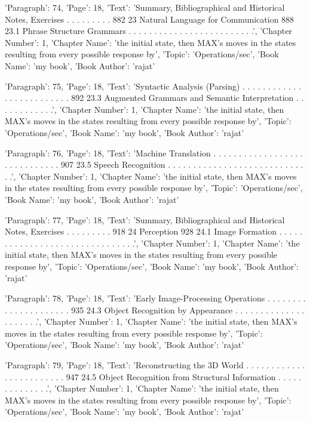 {'Paragraph': 74, 'Page': 18, 'Text': 'Summary, Bibliographical and Historical Notes, Exercises . . . . . . . . . 882 23 Natural Language for Communication 888 23.1 Phrase Structure Grammars . . . . . . . . . . . . . . . . . . . . . . . . .', 'Chapter Number': 1, 'Chapter Name': 'the initial state, then MAX’s moves in the states resulting from every possible response by', 'Topic': 'Operations/sec', 'Book Name': 'my book', 'Book Author': 'rajat'}

{'Paragraph': 75, 'Page': 18, 'Text': 'Syntactic Analysis (Parsing) . . . . . . . . . . . . . . . . . . . . . . . . . 892 23.3 Augmented Grammars and Semantic Interpretation . . . . . . . . . . . .', 'Chapter Number': 1, 'Chapter Name': 'the initial state, then MAX’s moves in the states resulting from every possible response by', 'Topic': 'Operations/sec', 'Book Name': 'my book', 'Book Author': 'rajat'}

{'Paragraph': 76, 'Page': 18, 'Text': 'Machine Translation . . . . . . . . . . . . . . . . . . . . . . . . . . . . . 907 23.5 Speech Recognition . . . . . . . . . . . . . . . . . . . . . . . . . . . . .', 'Chapter Number': 1, 'Chapter Name': 'the initial state, then MAX’s moves in the states resulting from every possible response by', 'Topic': 'Operations/sec', 'Book Name': 'my book', 'Book Author': 'rajat'}

{'Paragraph': 77, 'Page': 18, 'Text': 'Summary, Bibliographical and Historical Notes, Exercises . . . . . . . . . 918 24 Perception 928 24.1 Image Formation . . . . . . . . . . . . . . . . . . . . . . . . . . . . . . .', 'Chapter Number': 1, 'Chapter Name': 'the initial state, then MAX’s moves in the states resulting from every possible response by', 'Topic': 'Operations/sec', 'Book Name': 'my book', 'Book Author': 'rajat'}

{'Paragraph': 78, 'Page': 18, 'Text': 'Early Image-Processing Operations . . . . . . . . . . . . . . . . . . . . . 935 24.3 Object Recognition by Appearance . . . . . . . . . . . . . . . . . . . . .', 'Chapter Number': 1, 'Chapter Name': 'the initial state, then MAX’s moves in the states resulting from every possible response by', 'Topic': 'Operations/sec', 'Book Name': 'my book', 'Book Author': 'rajat'}

{'Paragraph': 79, 'Page': 18, 'Text': 'Reconstructing the 3D World . . . . . . . . . . . . . . . . . . . . . . . . 947 24.5 Object Recognition from Structural Information . . . . . . . . . . . . . .', 'Chapter Number': 1, 'Chapter Name': 'the initial state, then MAX’s moves in the states resulting from every possible response by', 'Topic': 'Operations/sec', 'Book Name': 'my book', 'Book Author': 'rajat'}

